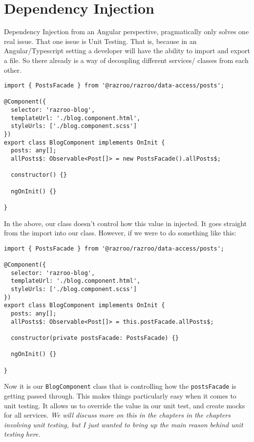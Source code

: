 \chapter{ Dependency Injection }

Dependency Injection from an Angular perspective, pragmatically only solves 
one real issue. That one issue is Unit Testing. That is, because in an 
Angular/Typescript setting a developer will have the ability to import and 
export a file. So there already is a way of decoupling different services/
classes from each other. 
\begin{lstlisting}[caption=passing in without dependency injection]
import { PostsFacade } from '@razroo/razroo/data-access/posts';  

@Component({
  selector: 'razroo-blog',
  templateUrl: './blog.component.html',
  styleUrls: ['./blog.component.scss']
})
export class BlogComponent implements OnInit {
  posts: any[];
  allPosts$: Observable<Post[]> = new PostsFacade().allPosts$;

  constructor() {}

  ngOnInit() {}

}
\end{lstlisting}
In the above, our class doesn't control how this value in injected. It 
goes straight from the import into our class. However, if we were to do 
something like this: 

\begin{lstlisting}[caption=passing in with dependency injection]
import { PostsFacade } from '@razroo/razroo/data-access/posts';  

@Component({
  selector: 'razroo-blog',
  templateUrl: './blog.component.html',
  styleUrls: ['./blog.component.scss']
})
export class BlogComponent implements OnInit {
  posts: any[];
  allPosts$: Observable<Post[]> = this.postFacade.allPosts$;

  constructor(private postsFacade: PostsFacade) {}

  ngOnInit() {}

}  
\end{lstlisting}

Now it is our \lstinline{BlogComponent} class that is controlling how the 
\lstinline{postsFacade} is getting passed through. This makes things 
particularly easy when it comes to unit testing. It allows us to override the 
value in our unit test, and create mocks for all services. \textit{We will discuss more
on this in the chapters in the chapters involving unit testing, but I just 
wanted to bring up the main reason behind unit testing here.}

